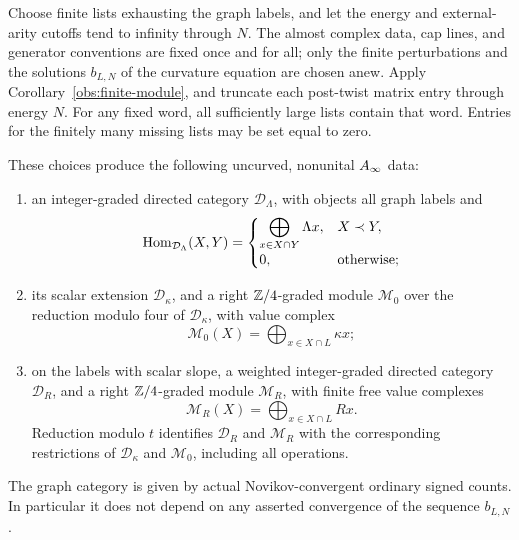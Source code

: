 Choose finite lists exhausting the graph labels, and let the energy and
external-arity cutoffs tend to infinity through \(N\).
The almost complex data, cap lines, and generator conventions are fixed
once and for all; only the finite perturbations and the solutions
\(b_{L,N}\) of the curvature equation are chosen anew.
Apply Corollary~\ref{obs:finite-module}, and truncate each post-twist
matrix entry through energy \(N\).  For any fixed word, all sufficiently
large lists contain that word.  Entries for the finitely many missing
lists may be set equal to zero.

\begin{proposition}\label{cat:module}
These choices produce the following uncurved, nonunital
\(A_\infty\) data:
\begin{enumerate}[label=\textup{(\roman*)}]
 \item an integer-graded directed category \(\mathcal D_\Lambda\), with
 objects all graph labels and
 \[
 \operatorname{Hom}_{\mathcal D_\Lambda}(X,Y)=
 \begin{cases}
   \displaystyle\bigoplus_{x\in X\cap Y}\Lambda x,&X\prec Y,\\
   0,&\text{otherwise};
 \end{cases}
 \]
 \item its scalar extension \(\mathcal D_\kappa\), and a right
 \(\mathbb Z/4\)-graded module \(\mathcal M_0\) over the reduction modulo four
 of \(\mathcal D_\kappa\), with value complex
 \[
 \mathcal M_0(X)=\bigoplus_{x\in X\cap L}\kappa x;
 \]
 \item on the labels with scalar slope, a weighted integer-graded
 directed category \(\mathcal D_R\), and a right \(\mathbb Z/4\)-graded module
 \(\mathcal M_R\), with finite free value complexes
 \[
 \mathcal M_R(X)=\bigoplus_{x\in X\cap L}R x.
 \]
 Reduction modulo \(t\) identifies \(\mathcal D_R\) and \(\mathcal M_R\)
 with the corresponding restrictions of \(\mathcal D_\kappa\) and
 \(\mathcal M_0\), including all operations.
\end{enumerate}
The graph category is given by actual Novikov-convergent ordinary signed
counts.  In particular it does not depend on any asserted convergence
of the sequence \(b_{L,N}\).
\end{proposition}

